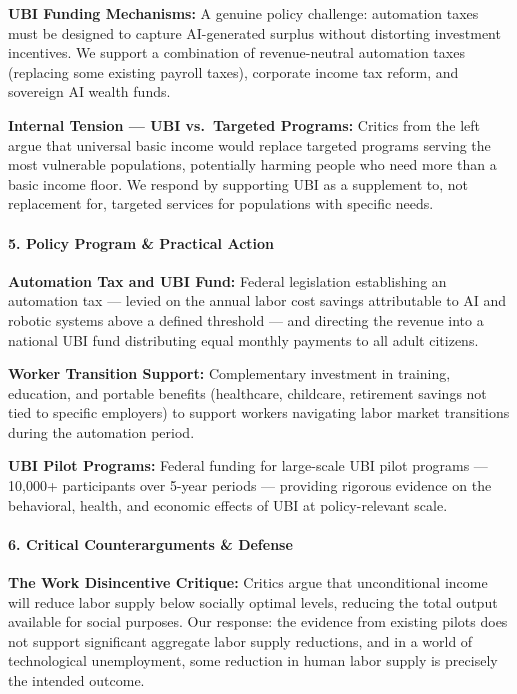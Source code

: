 \textbf{UBI Funding Mechanisms:} A genuine policy challenge: automation
taxes must be designed to capture AI-generated surplus without
distorting investment incentives. We support a combination of
revenue-neutral automation taxes (replacing some existing payroll
taxes), corporate income tax reform, and sovereign AI wealth funds.

\textbf{Internal Tension --- UBI vs.~Targeted Programs:} Critics from
the left argue that universal basic income would replace targeted
programs serving the most vulnerable populations, potentially harming
people who need more than a basic income floor. We respond by supporting
UBI as a supplement to, not replacement for, targeted services for
populations with specific needs.

\paragraph{5. Policy Program \& Practical
Action}\label{policy-program-practical-action-43}

\textbf{Automation Tax and UBI Fund:} Federal legislation establishing
an automation tax --- levied on the annual labor cost savings
attributable to AI and robotic systems above a defined threshold --- and
directing the revenue into a national UBI fund distributing equal
monthly payments to all adult citizens.

\textbf{Worker Transition Support:} Complementary investment in
training, education, and portable benefits (healthcare, childcare,
retirement savings not tied to specific employers) to support workers
navigating labor market transitions during the automation period.

\textbf{UBI Pilot Programs:} Federal funding for large-scale UBI pilot
programs --- 10,000+ participants over 5-year periods --- providing
rigorous evidence on the behavioral, health, and economic effects of UBI
at policy-relevant scale.

\paragraph{6. Critical Counterarguments \&
Defense}\label{critical-counterarguments-defense-43}

\textbf{The Work Disincentive Critique:} Critics argue that
unconditional income will reduce labor supply below socially optimal
levels, reducing the total output available for social purposes. Our
response: the evidence from existing pilots does not support significant
aggregate labor supply reductions, and in a world of technological
unemployment, some reduction in human labor supply is precisely the
intended outcome.

